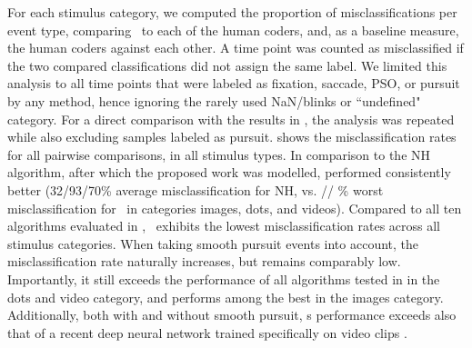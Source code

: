 For each stimulus category, we computed the proportion of misclassifications
per event type, comparing \remodnav\ to each of the human coders, and, as a
baseline measure, the human coders against each other.
%
A time point was counted as misclassified if the two compared classifications
did not assign the same label. We limited this analysis to all time points that
were labeled as fixation, saccade, PSO, or pursuit by any method, hence
ignoring the rarely used NaN/blinks or ``undefined" category. For a direct
comparison with the results in \cite{Andersson2017}, the analysis was repeated
while also excluding samples labeled as pursuit.  shows the
misclassification rates for all pairwise comparisons, in all stimulus types.
In comparison to the NH algorithm, after which the proposed work was modelled,
\remodnav performed consistently better (32/93/70\% average misclassification for NH,
vs. \imgMNALMclfWOP/\dotsRAALMclfWOP/ \videoRAALMclfWOP\% worst
misclassification for \remodnav\ in categories images, dots, and videos). Compared to all ten
algorithms evaluated in \citet{Andersson2017}, \remodnav\ exhibits the lowest
misclassification rates across all stimulus categories.
%
When taking smooth pursuit events into account, the misclassification rate
naturally increases, but remains comparably low. Importantly, it still exceeds the
performance of all algorithms tested in \citet{Andersson2017} in the dots
and video category, and performs among the best in the images category.
Additionally, both with and without smooth pursuit, \remodnav s performance
exceeds also that of a recent deep neural network trained specifically on
video clips \citep[compare Table 7: 34\% misclassification versus \videoMNALMCLF\%
for \remodnav]{Startsev2018}.


